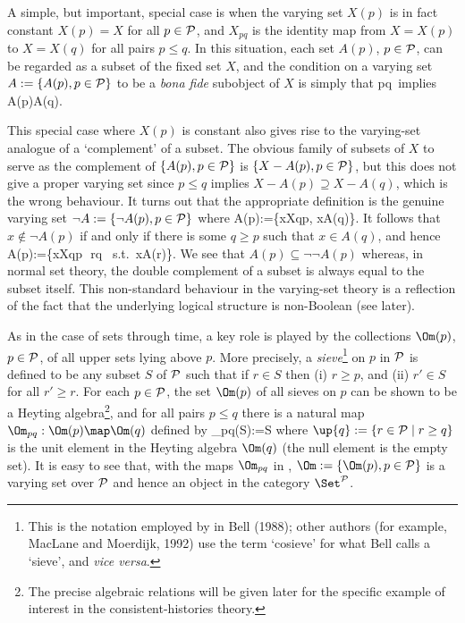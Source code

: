 	A simple, but important, special case is when the varying set
$X(p)$ is in fact constant \ie $X(p)=X$ for all $p\in\cal P$, and
$X_{pq}$ is the identity map from $X=X(p)$ to $X=X(q)$ for all pairs
$p\leq q$. In this situation, each set $A(p)$, $p\in\cal P$, can be
regarded as a subset of the fixed set $X$, and the condition on a
varying set $A:=\{A(p),p\in{\cal P}\}$ to be a {\em bona fide\/}
subobject of $X$ is simply that
\beq
		p\leq q\mbox{ implies } A(p)\subseteq A(q).	\label{sub-ob}
\eeq

	This special case where $X(p)$ is constant also gives rise to
the varying-set analogue of a `complement' of a subset. The obvious
family of subsets of $X$ to serve as the complement of $\{A(p),
p\in{\cal P}\}$ is $\{X-A(p),p\in{\cal P}\}$, but this does not give
a proper varying set since $p\leq q$ implies $X-A(p)\supseteq
X-A(q)$, which is the wrong behaviour. It turns out that the
appropriate definition is the genuine varying set $\neg A:=\{\neg
A(p),p\in{\cal P}\}$ where
\beq
	\neg A(p):=\{x\in X\mid \forall q\geq p, x\not\in A(q)\}.
										\label{Def:negA(p)}	
\eeq
It follows that $x\not\in\neg A(p)$ if and only if there is some
$q\geq p$ such that $x\in A(q)$, and hence
\beq
	\neg\neg A(p):=\{x\in X\mid \forall q\geq p\,\exists\, r\geq q
					\mbox{ s.t. }x\in A(r)\}.
\eeq
We see that $A(p)\subseteq\neg\neg A(p)$ whereas, in normal set
theory, the double complement of a subset is
always equal to the subset itself.  This non-standard behaviour in the
varying-set theory is a reflection of the fact that the underlying
logical structure is non-Boolean (see later). 

	As in the case of sets through time, a key role is played
by the collections $\Om(p)$, $p\in\cal P$, of all upper sets lying
above $p$.  More precisely, a {\em sieve\/}\footnote{This is the
notation employed by in Bell (1988); other authors (for example,
MacLane and Moerdijk, 1992) use the term `cosieve' for what Bell
calls a `sieve', and {\em vice versa}.} on $p$ in $\cal P$ is
defined to be any subset $S$ of $\cal P$ such that if $r\in S$ then
(i) $r\geq p$, and (ii) $r'\in S$ for all $r'\geq r$.  For each
$p\in\cal P$, the set $\Om(p)$ of all sieves on $p$ can be shown to
be a Heyting algebra\footnote{The precise algebraic relations will
be given later for the specific example of interest in the
consistent-histories theory.}, and for all pairs $p\leq q$ there is
a natural map $\Om_{pq}:\Om(p)\map\Om(q)$ defined by
\beq
		\Om_{pq}(S):=S\cap{}				\label{Def:Ompq}
\eeq 
where $\up{q}:=\{r\in{\cal P}\mid r\geq q\}$ is the unit element
in the Heyting algebra $\Om(q)$ (the null element is the empty set).
It is easy to see that, with the maps $\Om_{pq}$ in ,
$\Om:=\{\Om(p),p\in{\cal P}\}$ is a varying set over $\cal P$
and hence an object in the category $\Set^{\cal P}$.

